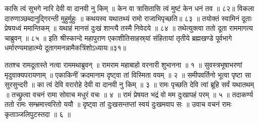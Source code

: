 कासि त्वं सुभगे नारि देवी वा दानवी नु किम् ॥
केन वा त्रासितासि त्वं मुष्टं केन धनं तव ॥ ८२॥
विकला दारुणाञ्छब्दानुद्गिरन्ती मुहुर्मुहुः ॥
कथयस्व यथातथ्यं रामो राजाभिपृच्छति॥ ८३ ॥
तयोक्तं स्वामिनं दूताः प्रेषयध्वं ममान्तिकम् ॥
यथाहं मानसं दुःखं शान्त्यै तस्मै निवेदये ॥ ८४ ॥
तथेत्युक्त्वा ततो दूता राममागत्य चाब्रुवन् ॥ ८५ ॥
इति श्रीस्कान्दे महापुराण एकाशीतिसाहस्र्यां संहितायां तृतीये ब्रह्मखण्डे पूर्वभागे धर्मारण्यमाहात्म्ये दूतागमनन्नामैकत्रिंशोऽध्यायः॥३१॥


ततश्च रामदूतास्ते नत्वा राममथाब्रुवन् ॥
रामराम महाबाहो वरनारी शुभानना ॥ १ ॥
सुवस्त्रभूषाभरणां मृदुवाक्यपरायणाम् ॥
एकाकिनीं क्रदमानाम दृष्ट्वा तां विस्मिता वयम् ॥ २ ॥
समीपवर्तिनो भूत्वा पृष्टा सा सुरसुन्दरी ॥
का त्वं देवि वरारोहे देवी वा दानवी नु किम् ॥ ३ ॥
रामः पृच्छति देवि त्वां ब्रूहि सर्वं यथातथम् ॥
तच्छ्रुत्वा वचनं रामा सोवाच मधुरं वचः ॥ ४ ॥
रामं प्रेषयत भद्रं वो मम दुःखापहं परम् ॥ ५ ॥
तदाकर्ण्य ततो रामः सम्भ्रमात्त्वरितो ययौ ॥
दृष्ट्वा तां दुःखसन्तप्तां स्वयं दुःखमवाप सः ॥
उवाच वचनं रामः कृताञ्जलिपुटस्तदा ॥ ६ ॥

